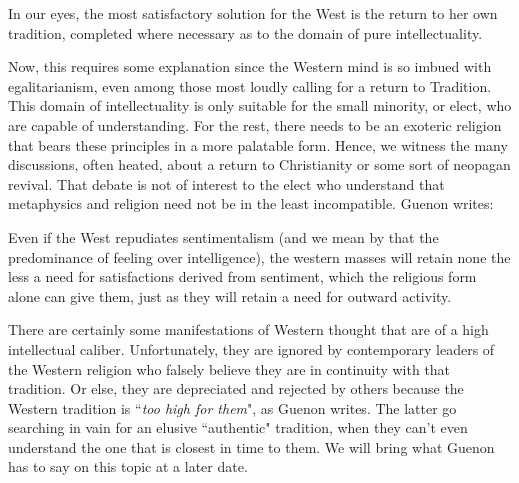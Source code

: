 \begin{quotex}
In our eyes, the most satisfactory solution for the West is the return to her own tradition, completed where necessary as to the domain of pure intellectuality.

\end{quotex}
Now, this requires some explanation since the Western mind is so imbued with egalitarianism, even among those most loudly calling for a return to Tradition. This domain of intellectuality is only suitable for the small minority, or elect, who are capable of understanding. For the rest, there needs to be an exoteric religion that bears these principles in a more palatable form. Hence, we witness the many discussions, often heated, about a return to Christianity or some sort of neopagan revival. That debate is not of interest to the elect who understand that metaphysics and religion need not be in the least incompatible. Guenon writes:

\begin{quotex}
Even if the West repudiates sentimentalism (and we mean by that the predominance of feeling over intelligence), the western masses will retain none the less a need for satisfactions derived from sentiment, which the religious form alone can give them, just as they will retain a need for outward activity.

\end{quotex}
There are certainly some manifestations of Western thought that are of a high intellectual caliber. Unfortunately, they are ignored by contemporary leaders of the Western religion who falsely believe they are in continuity with that tradition. Or else, they are depreciated and rejected by others because the Western tradition is ``\emph{too high for them}", as Guenon writes. The latter go searching in vain for an elusive ``authentic" tradition, when they can't even understand the one that is closest in time to them. We will bring what Guenon has to say on this topic at a later date.

